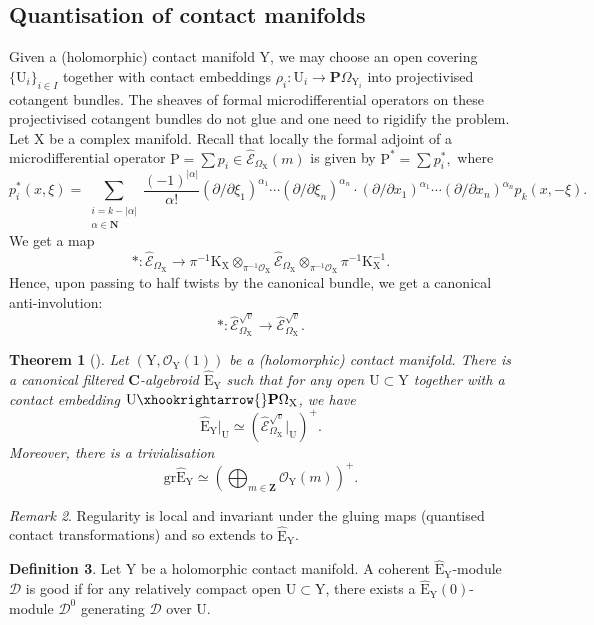 \documentclass{article}
\theoremstyle{plain}
\newtheorem{theorem}{Theorem}[subsection]   %
\theoremstyle{definition}
\newtheorem{definition}[theorem]{Definition}
\theoremstyle{remark}
\newtheorem{remark}[theorem]{Remark}
\newcommand{\Em}{\widehat{\mathscr{E}}_{\Omega_\mr{X}}}
\newcommand{\mr}{\mathrm}
\newcommand{\Z}{\mathbf Z}
\newcommand{\C}{\mathbf C}
\newcommand{\3}{\vspace{3mm}}
\newcommand{\2}{\vspace{2mm}}
\newcommand{\1}{\vspace{1mm}}
\begin{document}
\subsection{Quantisation of contact manifolds}
Given a (holomorphic) contact manifold $\mr{Y}$, we may choose an open covering $\{\mr{U}_i\}_{i\in I}$ together with contact embeddings $\rho_i:\mr{U}_i\to \mr{\mathbf{P}}\Omega_{\mr{Y}_i}$ into projectivised cotangent bundles. The sheaves of formal microdifferential operators on these projectivised cotangent bundles do not glue and one need to rigidify the problem.\\
Let $\mr{X}$ be a complex manifold. Recall that locally the formal adjoint of a microdifferential operator $\mr{P}=\sum p_i \in \Em(m)$ is given by $\mr{P}^*=\sum p^*_i,$ where $$p_i^*(x,	\xi)= \sum_{\substack{i=k-|\alpha|\\ \alpha \in \mathbf{N}}}\frac{(-1)^{|\alpha|}}{\alpha!}(\partial/\partial\xi_1)^{\alpha_1}\cdots (\partial/\partial\xi_n)^{\alpha_n}\cdot (\partial/\partial x_1)^{\alpha_1}\cdots (\partial/\partial x_n)^{\alpha_n}p_k(x,-\xi).$$
We get a map $$*:\Em \to \pi^{-1}\mr{K}_\mr{X}\otimes_{\pi^{-1}\mathscr{O}_\mr{X}}\Em\otimes_{\pi^{-1}\mathscr{O}_\mr{X}}\pi^{-1}\mr{K}_\mr{X}^{-1}.$$
Hence, upon passing to half twists by the canonical bundle, we get a canonical anti-involution:
$$*:\Em^{\sqrt{v}}\to \Em^{\sqrt{v}}.$$
\begin{theorem}[\cite{MR3276591}]
Let $\left(\mr{Y},\mathscr{O}_\mr{Y}(1)\right)$ be a (holomorphic) contact manifold. There is a canonical filtered $\C$-algebroid $\widehat{\mr{E}}_\mr{Y}$ such that for any open $\mr{U}\subset \mr{Y}$ together with a contact embedding $\mr{U}\xhookrightarrow{} \mr{\mathbf{P}}\Omega_{\mr{X}}$, we have $$\widehat{\mr{E}}_\mr{Y}|_\mr{U}\simeq \left(\Em^{\sqrt{v}}|_\mr{U}\right)^{+}.$$ Moreover, there is a trivialisation $$\mr{gr}\widehat{\mr{E}}_\mr{Y}\simeq \left(\bigoplus_{m\in \Z}\mathscr{O}_\mr{Y}(m)\right)^{+}.$$
\end{theorem}
\2
\begin{remark}
Regularity is local and invariant under the gluing maps (quantised contact transformations) and so extends to $\widehat{\mr{E}}_\mr{Y}$.
\end{remark}
\2
\begin{definition}
Let $\mr{Y}$ be a holomorphic contact manifold. A coherent $\widehat{\mr{E}}_\mr{Y}$-module $\mathscr{D}$ is good if for any relatively compact open $\mr{U}\subset \mr{Y}$, there exists a $\widehat{\mr{E}}_\mr{Y}(0)$-module $\mathscr{D}^{0}$ generating $\mathscr{D}$ over $\mr{U}$.
\end{definition}
\end{document}
